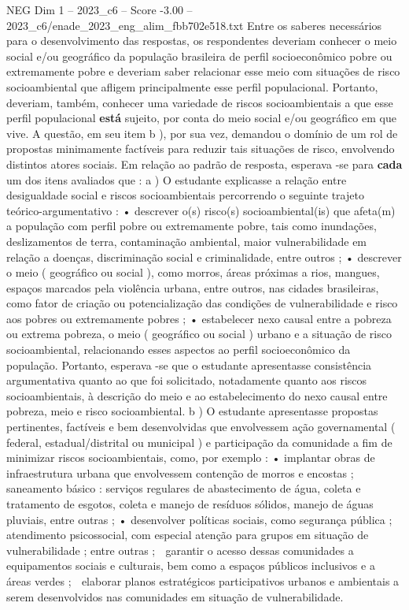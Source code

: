 \begin{textsample}{NEG Dim 1 – 2023\_c6 – Score -3.00 – 2023\_c6/enade\_2023\_eng\_alim\_fbb702e518.txt}
Entre os saberes necessários para o desenvolvimento das respostas, os respondentes deveriam conhecer o meio social e/ou geográfico da população brasileira de perfil socioeconômico pobre ou extremamente pobre e deveriam saber relacionar esse meio com situações de risco socioambiental que afligem principalmente esse perfil populacional.
Portanto, deveriam, também, conhecer uma variedade de riscos socioambientais a que esse perfil populacional \textbf{está} sujeito, por conta do meio social e/ou geográfico em que vive.
A questão, em seu item b ), por sua vez, demandou o domínio de um rol de propostas minimamente factíveis para reduzir tais situações de risco, envolvendo distintos atores sociais.
Em relação ao padrão de resposta, esperava -se para \textbf{cada} um dos itens avaliados que : a ) O estudante explicasse a relação entre desigualdade social e riscos socioambientais percorrendo o seguinte trajeto teórico-argumentativo : • descrever o(s) risco(s) socioambiental(is) que afeta(m) a população com perfil pobre ou extremamente pobre, tais como inundações, deslizamentos de terra, contaminação ambiental, maior vulnerabilidade em relação a doenças, discriminação social e criminalidade, entre outros ; • descrever o meio ( geográfico ou social ), como morros, áreas próximas a rios, mangues, espaços marcados pela violência urbana, entre outros, nas cidades brasileiras, como fator de criação ou potencialização das condições de vulnerabilidade e risco aos pobres ou extremamente pobres ; • estabelecer nexo causal entre a pobreza ou extrema pobreza, o meio ( geográfico ou social ) urbano e a situação de risco socioambiental, relacionando esses aspectos ao perfil socioeconômico da população.
Portanto, esperava -se que o estudante apresentasse consistência argumentativa quanto ao que foi solicitado, notadamente quanto aos riscos socioambientais, à descrição do meio e ao estabelecimento do nexo causal entre pobreza, meio e risco socioambiental. b ) O estudante apresentasse propostas pertinentes, factíveis e bem desenvolvidas que envolvessem ação governamental ( federal, estadual/distrital ou municipal ) e participação da comunidade a fim de minimizar riscos socioambientais, como, por exemplo : • implantar obras de infraestrutura urbana que envolvessem contenção de morros e encostas ; saneamento básico : serviços regulares de abastecimento de água, coleta e tratamento de esgotos, coleta e manejo de resíduos sólidos, manejo de águas pluviais, entre outras ; • desenvolver políticas sociais, como segurança pública ; atendimento psicossocial, com especial atenção para grupos em situação de vulnerabilidade ; entre outras ;  garantir o acesso dessas comunidades a equipamentos sociais e culturais, bem como a espaços públicos inclusivos e a áreas verdes ;  elaborar planos estratégicos participativos urbanos e ambientais a serem desenvolvidos nas comunidades em situação de vulnerabilidade.

\end{textsample}
